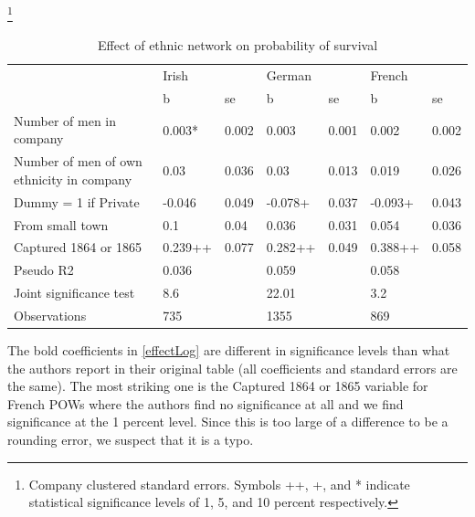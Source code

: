 \documentclass[draft.tex]{subfiles}
\begin{document}
\begin{table}
\caption{Effect of ethnic network on probability of survival}\footnote{Company clustered standard errors. Symbols ++, +, and * indicate statistical significance levels of 1, 5, and 10 percent respectively.}
\label{ethnic}
\begin{tabular}{lllllll}
\hline

                                          & \multicolumn{2}{l}{Irish} & \multicolumn{2}{l}{German} & \multicolumn{2}{l}{French} \\
                                          & b                         & se                         & b                          & se & b & se \\
Number of men in company                  & 0.003*                    & 0.002                      & 0.003                      & 0.001 & 0.002 & 0.002 \\
Number of men of own ethnicity in company & 0.03                      & 0.036                      & 0.03                       & 0.013 & 0.019 & 0.026 \\
Dummy = 1 if Private                      & -0.046                    & 0.049                      & -0.078+                    & 0.037 & -0.093+ & 0.043 \\
From small town                           & 0.1                       & 0.04                       & 0.036                      & 0.031 & 0.054 & 0.036 \\
Captured 1864 or 1865                     & 0.239++                   & 0.077                      & 0.282++                    & 0.049 & 0.388++ & 0.058 \\
Pseudo R2                                 & 0.036                     &                            & 0.059                      &  & 0.058 &  \\
Joint significance test                   & 8.6                       &                            & 22.01                      &  & 3.2 &  \\
Observations                              & 735                       &                            & 1355                       &  & 869 &  \\
\end{tabular}
\end{table}

The bold coefficients in \autoref{effectLog} are different in significance levels than what the authors report in their original table (all coefficients and standard errors are the same). The most striking one is the Captured 1864 or 1865 variable for French POWs where the authors find no significance at all and we find significance at the 1 percent level. Since this is too large of a difference to be a rounding error, we suspect that it is a typo.
\end{document}
